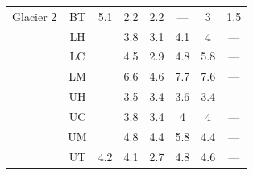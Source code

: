 \documentclass[12pt]{article}
\begin{document}
\begin{table}[]
\begin{tabular}{cccccccc}
\multirow{-8}{*}{Glacier 2} & BT & \multirow{-8}{*}{5.1} & 2.2 & 2.2 & --- & 3 & 1.5 \\
\rowcolor[HTML]{EFEFEF} 
\cellcolor[HTML]{EFEFEF} & LH & \cellcolor[HTML]{EFEFEF} & 3.8 & 3.1 & 4.1 & 4 & --- \\
\rowcolor[HTML]{EFEFEF} 
\cellcolor[HTML]{EFEFEF} & LC & \cellcolor[HTML]{EFEFEF} & 4.5 & 2.9 & 4.8 & 5.8 & --- \\
\rowcolor[HTML]{EFEFEF} 
\cellcolor[HTML]{EFEFEF} & LM & \cellcolor[HTML]{EFEFEF} & 6.6 & 4.6 & 7.7 & 7.6 & --- \\
\rowcolor[HTML]{EFEFEF} 
\cellcolor[HTML]{EFEFEF} & UH & \cellcolor[HTML]{EFEFEF} & 3.5 & 3.4 & 3.6 & 3.4 & --- \\
\rowcolor[HTML]{EFEFEF} 
\cellcolor[HTML]{EFEFEF} & UC & \cellcolor[HTML]{EFEFEF} & 3.8 & 3.4 & 4 & 4 & --- \\
\rowcolor[HTML]{EFEFEF} 
\cellcolor[HTML]{EFEFEF} & UM & \cellcolor[HTML]{EFEFEF} & 4.8 & 4.4 & 5.8 & 4.4 & --- \\
\rowcolor[HTML]{EFEFEF} 
\multirow{-7}{*}{\cellcolor[HTML]{EFEFEF}Glacier 13} & UT & \multirow{-7}{*}{\cellcolor[HTML]{EFEFEF}4.2} & 4.1 & 2.7 & 4.8 & 4.6 & ---
\end{tabular}
\end{table}
\end{document}

